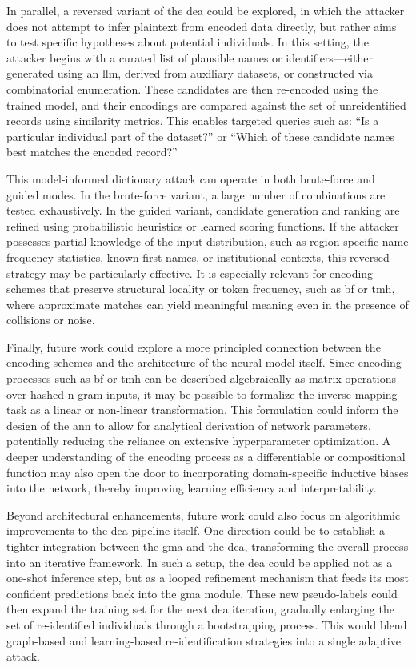 In parallel, a reversed variant of the \ac{dea} could be explored, in which the attacker does not attempt to infer plaintext from encoded data directly, but rather aims to test specific hypotheses about potential individuals.
In this setting, the attacker begins with a curated list of plausible names or identifiers—either generated using an \ac{llm}, derived from auxiliary datasets, or constructed via combinatorial enumeration.
These candidates are then re-encoded using the trained model, and their encodings are compared against the set of unreidentified records using similarity metrics.
This enables targeted queries such as: ``Is a particular individual part of the dataset?'' or ``Which of these candidate names best matches the encoded record?''

This model-informed dictionary attack can operate in both brute-force and guided modes.
In the brute-force variant, a large number of combinations are tested exhaustively.
In the guided variant, candidate generation and ranking are refined using probabilistic heuristics or learned scoring functions.
If the attacker possesses partial knowledge of the input distribution, such as region-specific name frequency statistics, known first names, or institutional contexts, this reversed strategy may be particularly effective.
It is especially relevant for encoding schemes that preserve structural locality or token frequency, such as \ac{bf} or \ac{tmh}, where approximate matches can yield meaningful meaning even in the presence of collisions or noise.


Finally, future work could explore a more principled connection between the encoding schemes and the architecture of the neural model itself.
Since encoding processes such as \ac{bf} or \ac{tmh} can be described algebraically as matrix operations over hashed n-gram inputs, it may be possible to formalize the inverse mapping task as a linear or non-linear transformation.
This formulation could inform the design of the \ac{ann} to allow for analytical derivation of network parameters, potentially reducing the reliance on extensive hyperparameter optimization.
A deeper understanding of the encoding process as a differentiable or compositional function may also open the door to incorporating domain-specific inductive biases into the network, thereby improving learning efficiency and interpretability.

Beyond architectural enhancements, future work could also focus on algorithmic improvements to the \ac{dea} pipeline itself.
One direction could be to establish a tighter integration between the \ac{gma} and the \ac{dea}, transforming the overall process into an iterative framework.
In such a setup, the \ac{dea} could be applied not as a one-shot inference step, but as a looped refinement mechanism that feeds its most confident predictions back into the \ac{gma} module.
These new pseudo-labels could then expand the training set for the next \ac{dea} iteration, gradually enlarging the set of re-identified individuals through a bootstrapping process.
This would blend graph-based and learning-based re-identification strategies into a single adaptive attack.

